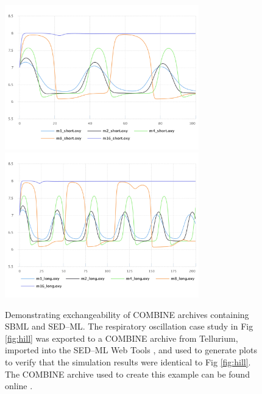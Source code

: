 \documentclass[10pt,letterpaper]{article}
\begin{document}
\begin{figure}[h]
  \includegraphics[width=0.75\textwidth]{swt-fig1.pdf}
  \includegraphics[width=0.75\textwidth]{swt-fig2.pdf}
  \caption{Demonstrating exchangeability of COMBINE archives containing SBML and SED--ML. The respiratory oscillation case study in Fig \ref{fig:hill} was exported to a COMBINE archive from Tellurium, imported into the SED--ML Web Tools \cite{bergmann2017sed}, and used to generate plots to verify that the simulation results were identical to Fig \ref{fig:hill}. The COMBINE archive used to create this example can be found online \cite{wolfhillstudy}. }
  \label{fig:swt}
\end{figure}

\clearpage
\end{document}

